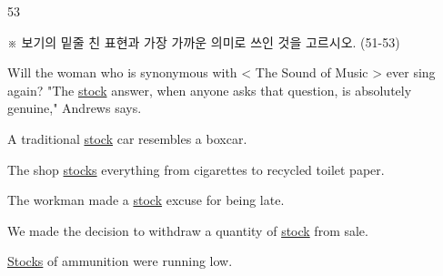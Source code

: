 \begin{question}{53}
\begin{framedtext}
※ 보기의 밑줄 친 표현과 가장 가까운 의미로 쓰인 것을 고르시오. (51-53) \par
\end{framedtext}
Will the woman who is synonymous with < The Sound of Music > ever sing again? "The \uline{stock} answer, when anyone asks that question, is absolutely genuine," Andrews says.
\begin{choices}
  \item A traditional \uline{stock} car resembles a boxcar.
  \item The shop \uline{stocks} everything from cigarettes to recycled toilet paper.
  \item The workman made a \uline{stock} excuse for being late.
  \item We made the decision to withdraw a quantity of \uline{stock} from sale.
  \item \uline{Stocks} of ammunition were running low.
\end{choices}
\end{question}
